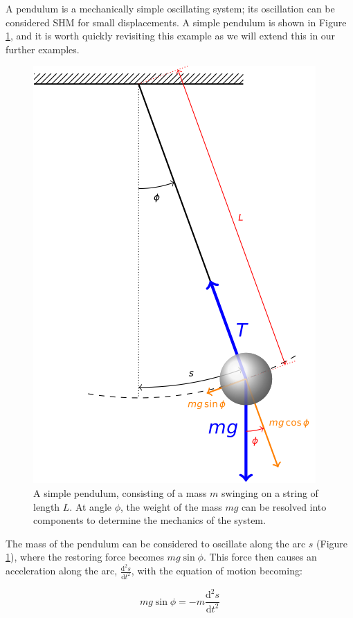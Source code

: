 \documentclass[
]{book}
\begin{document}
A pendulum is a mechanically simple oscillating system; its oscillation can be considered SHM for small displacements. A simple pendulum is shown in Figure \ref{fig:ch2-simplependulum1}, and it is worth quickly revisiting this example as we will extend this in our further examples.

\begin{figure}

{\centering \includegraphics[width=0.7\linewidth]{visualisations/LaTeX/ch2-simplependulum1} 

}

\caption{A simple pendulum, consisting of a mass $m$ swinging on a string of length $L$. At angle $\phi$, the weight of the mass $mg$ can be resolved into components to determine the mechanics of the system.}\label{fig:ch2-simplependulum1}
\end{figure}

The mass of the pendulum can be considered to oscillate along the arc \(s\) (Figure \ref{fig:ch2-simplependulum1}), where the restoring force becomes \(mg \sin \phi\). This force then causes an acceleration along the arc, \(\frac{\mathrm{d}^2 s}{\mathrm{d} t^2}\), with the equation of motion becoming:

\begin{equation}
mg \sin \phi = - m \frac{\mathrm{d}^2 s}{\mathrm{d} t^2}
\label{eq:ch2-simplependulum-a1}
\end{equation}
\end{document}
